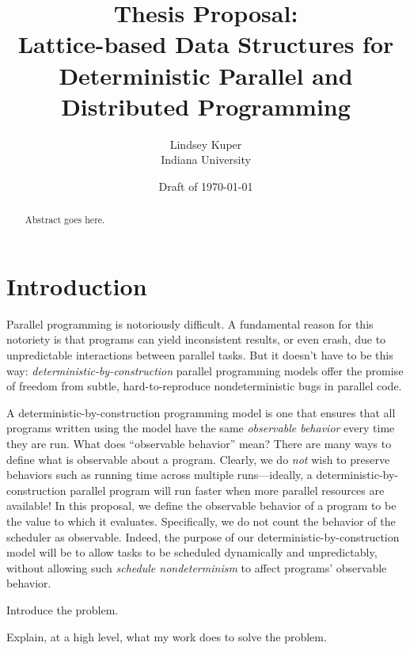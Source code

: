 \documentclass{article}
\begin{document}
\title{Thesis Proposal: \\
  Lattice-based Data Structures for \\
  Deterministic Parallel and Distributed Programming}

\author{Lindsey Kuper \\ Indiana University}

\date{Draft of \today}

\maketitle

\begin{abstract}
  Abstract goes here.
\end{abstract}

\section{Introduction}

Parallel programming is notoriously difficult.  
A fundamental reason for this notoriety is that programs can yield
inconsistent results, or even crash, due to unpredictable interactions
between parallel tasks.  But it doesn't have to be this way:
\emph{deterministic-by-construction} parallel programming models offer
the promise of freedom from subtle, hard-to-reproduce nondeterministic
bugs in parallel code.

A deterministic-by-construction programming model is one that ensures
that all programs written using the model have the same
\emph{observable behavior} every time they are run.  What does
``observable behavior'' mean?  There are many ways to define what is
observable about a program.  Clearly, we do \emph{not} wish to
preserve behaviors such as running time across multiple
runs---ideally, a deterministic-by-construction parallel program will
run faster when more parallel resources are available!  In this
proposal, we define the observable behavior of a program to be the
value to which it evaluates.  Specifically, we do not count the
behavior of the scheduler as observable.  Indeed, the purpose of our
deterministic-by-construction model will be to allow tasks to be
scheduled dynamically and unpredictably, without allowing such
\emph{schedule nondeterminism} to affect programs' observable
behavior.

Introduce the problem.

Explain, at a high level, what my work does to solve the problem.
\end{document}
